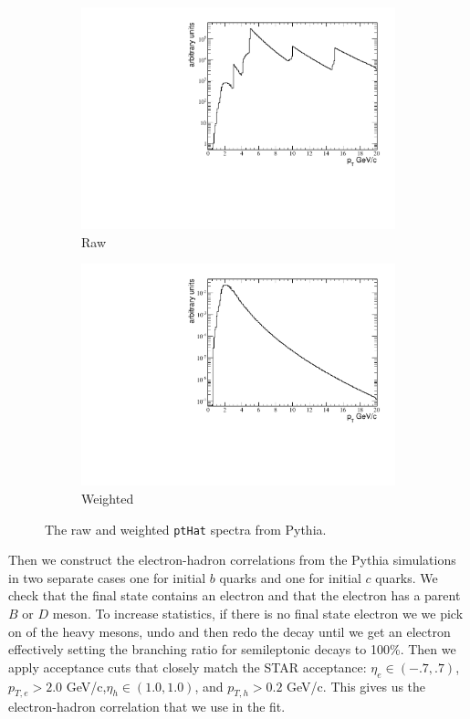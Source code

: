 \begin{figure}[htbp]
	\begin{subfigure}{0.5\textwidth}
		\includegraphics[width=\textwidth]{Plots/Correlations/pthat_raw.pdf}
		\caption{Raw}
		\label{fig:PythiaProcessa}
	\end{subfigure}	
	\begin{subfigure}{0.5\textwidth}
		\includegraphics[width=\textwidth]{Plots/Correlations/pthat_weighted.pdf}
		\caption{Weighted}
		\label{fig:PythiaProcessb}
	\end{subfigure}	
\caption[Raw and Weighted Pythia Generated Hard Processes]{The raw and weighted \texttt{ptHat} spectra from Pythia.}
\label{fig:PythiaProcess}
\end{figure}

Then we construct the electron-hadron correlations from the Pythia simulations in two separate cases one for initial $b$ quarks and one for initial $c$ quarks. We check that the final state contains an electron and that the electron has a parent $B$ or $D$ meson. To increase statistics, if there is no final state electron we we pick on of the heavy mesons, undo and then redo the decay until we get an electron effectively setting the branching ratio for semileptonic decays to 100\%. Then we apply acceptance cuts that closely match the STAR acceptance: $\eta_e \in (-.7,.7)$, $p_{T,e} > 2.0$ GeV/c,$\eta_h \in (1.0,1.0)$, and $p_{T,h} > 0.2$ GeV/c. This gives us the electron-hadron correlation that we use in the fit. 


